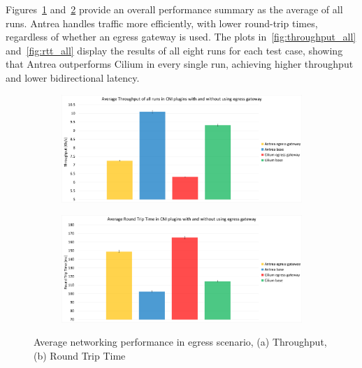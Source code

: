 Figures~\ref{fig:throughput_avg} and~\ref{fig:rtt_avg} provide an overall performance summary as the average of all runs. Antrea handles traffic more efficiently, with lower round-trip times, regardless of whether an egress gateway is used. The plots in~\ref{fig:throughput_all} and~\ref{fig:rtt_all} display the results of all eight runs for each test case, showing that Antrea outperforms Cilium in every single run, achieving higher throughput and lower bidirectional latency.

\begin{figure}[H]
    \centering
    \begin{subfigure}[b]{1\textwidth}
        \includegraphics[width=\textwidth]{plots/egress/throughput_total_average.png}
        \caption{}
        \label{fig:throughput_avg}
    \end{subfigure}
    \begin{subfigure}[b]{1\textwidth}
        \includegraphics[width=\textwidth]{plots/egress/rtt_total_average.png}
        \caption{}
        \label{fig:rtt_avg}
    \end{subfigure}
    
    \caption{Average networking performance in egress scenario, (a) Throughput, (b) Round Trip Time}
    \label{fig:networking_avg}
\end{figure}

